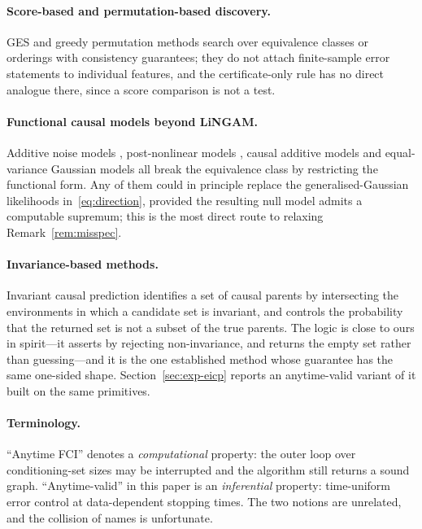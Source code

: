 \paragraph{Score-based and permutation-based discovery.} GES
\citep{chickering2002optimal} and greedy permutation methods
\citep{solus2021consistency} search over equivalence classes or orderings with
consistency guarantees; they do not attach finite-sample error statements to
individual features, and the certificate-only rule has no direct analogue
there, since a score comparison is not a test.

\paragraph{Functional causal models beyond LiNGAM.} Additive noise models
\citep{hoyer2009nonlinear}, post-nonlinear models
\citep{zhang2009identifiability}, causal additive models
\citep{buhlmann2014cam} and equal-variance Gaussian models
\citep{peters2014identifiability} all break the equivalence class by
restricting the functional form. Any of them could in principle replace the
generalised-Gaussian likelihoods in~\eqref{eq:direction}, provided the
resulting null model admits a computable supremum; this is the most direct
route to relaxing Remark~\ref{rem:misspec}.

\paragraph{Invariance-based methods.} Invariant causal prediction
\citep{peters2016causal} identifies a set of causal parents by intersecting
the environments in which a candidate set is invariant, and controls the
probability that the returned set is not a subset of the true parents. The
logic is close to ours in spirit---it asserts by rejecting non-invariance, and
returns the empty set rather than guessing---and it is the one established
method whose guarantee has the same one-sided shape.
Section~\ref{sec:exp-eicp} reports an anytime-valid variant of it built on the
same primitives.

\paragraph{Terminology.} ``Anytime FCI'' \citep{spirtes2001anytime} denotes a
\emph{computational} property: the outer loop over conditioning-set sizes may
be interrupted and the algorithm still returns a sound graph.
``Anytime-valid'' in this paper is an \emph{inferential} property:
time-uniform error control at data-dependent stopping times. The two notions
are unrelated, and the collision of names is unfortunate.
